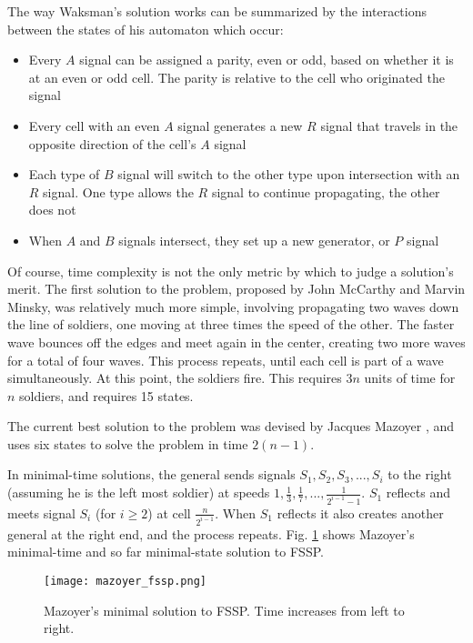 \documentclass[11pt,a4paper]{article}
\begin{document}
    The way Waksman's solution works can be summarized by the interactions
    between the states of his automaton which occur:
    \begin{itemize}
        \item Every $A$ signal can be assigned a parity, even or odd, based on
            whether it is at an even or odd cell. The parity is relative to the
            cell who originated the signal
        \item Every cell with an even $A$ signal generates a new $R$ signal that
            travels in the opposite direction of the cell's $A$ signal
        \item Each type of $B$ signal will switch to the other type upon
            intersection with an $R$ signal. One type allows the $R$ signal to
            continue propagating, the other does not
        \item When $A$ and $B$ signals intersect, they set up a new generator,
            or $P$ signal
    \end{itemize}

    Of course, time complexity is not the only metric by which to judge a
    solution's merit. The first solution to the problem, proposed by John
    McCarthy and Marvin Minsky, was relatively much more simple, involving
    propagating two waves down the line of soldiers, one moving at three times
    the speed of the other. The faster wave bounces off the edges and meet again
    in the center, creating two more waves for a total of four waves. This
    process repeats, until each cell is part of a wave simultaneously. At this
    point, the soldiers fire. This requires $3n$ units of time for $n$ soldiers,
    and requires 15 states.

    The current best solution to the problem was devised by Jacques Mazoyer
    \cite{FSSP_best}, and uses six states to solve the problem in time $2(n-1)$.

    In minimal-time solutions, the general sends signals $S_1, S_2, S_3, ..., S_i$ to
    the right (assuming he is the left most soldier) at speeds $1, \frac{1}{3},
    \frac{1}{7}, ..., \frac{1}{2^{i-1}-1}$. $S_1$ reflects and meets signal
    $S_i$ (for $i \ge 2$) at cell $\frac{n}{2^{i-1}}$. When $S_1$ reflects it also
    creates another general at the right end, and the process repeats. Fig.
    \ref{fig:mazoyer} shows Mazoyer's minimal-time and so far minimal-state
    solution to FSSP.

    \begin{figure}[h]
        \centering
        \texttt{[image: mazoyer\_fssp.png]}
        \caption{Mazoyer's minimal solution to FSSP. Time increases from left to
        right.}
        \label{fig:mazoyer}
    \end{figure}
\end{document}

